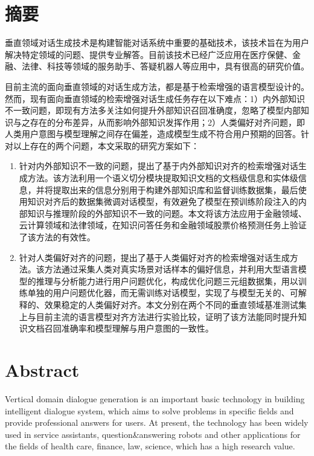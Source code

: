 \chapter{摘\texorpdfstring{\quad}{}要}

垂直领域对话生成技术是构建智能对话系统中重要的基础技术，该技术旨在为用户解决特定领域的问题、提供专业解答。目前该技术已经广泛应用在医疗保健、金融、法律、科技等领域的服务助手、答疑机器人等应用中，具有很高的研究价值。

目前主流的面向垂直领域的对话生成方法，都是基于检索增强的语言模型设计的。然而，现有面向垂直领域的检索增强对话生成任务存在以下难点：1）内外部知识不一致问题，即现有方法多关注如何提升外部知识召回准确度，忽略了模型内部知识与之存在的分布差异，从而影响外部知识发挥作用；2）人类偏好对齐问题，即人类用户意图与模型理解之间存在偏差，造成模型生成不符合用户预期的回答。针对以上存在的两个问题，本文采取的研究方案如下：

\begin{enumerate}[topsep = 0 pt, itemsep= 0 pt, parsep=0pt, partopsep=0pt, leftmargin=0pt, itemindent=44pt, labelsep=6pt, listparindent=24pt, label=\arabic*)]
	\item 针对内外部知识不一致的问题，提出了基于内外部知识对齐的检索增强对话生成方法。该方法利用一个语义切分模块提取知识文档的文档级信息和实体级信息，并将提取出来的信息分别用于构建外部知识库和监督训练数据集，最后使用知识对齐后的数据集微调对话模型，有效避免了模型在预训练阶段注入的内部知识与推理阶段的外部知识不一致的问题。本文将该方法应用于金融领域、云计算领域和法律领域，在知识问答任务和金融领域股票价格预测任务上验证了该方法的有效性。

	\item 针对人类偏好对齐的问题，提出了基于人类偏好对齐的检索增强对话生成方法。该方法通过采集人类对真实场景对话样本的偏好信息，并利用大型语言模型的推理与分析能力进行用户问题优化，构成优化问题三元组数据集，用以训练单独的用户问题优化器，而无需训练对话模型，实现了与模型无关的、可解释的、效果稳定的人类偏好对齐。本文分别在两个不同的垂直领域基准测试集上与目前主流的语言模型对齐方法进行实验比较，证明了该方法能同时提升知识文档召回准确率和模型理解与用户意图的一致性。
\end{enumerate}


\chapter{Abstract}

Vertical domain dialogue generation is an important basic technology in building intelligent dialogue system, which aims to solve problems in specific fields and provide professional answers for users. At present, the technology has been widely used in service assistants, question\&answering robots and other applications for the fields of health care, finance, law, science, which has a high research value.

